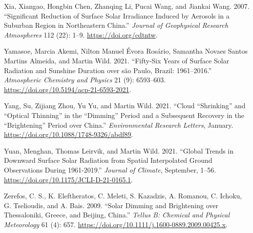 \documentclass[
]{article}
\newlength{\cslhangindent}
\newlength{\cslentryspacingunit} %
\newenvironment{CSLReferences}[2] %
 {%
  \setlength{\parindent}{0pt}
  \ifodd #1
  \let\oldpar\par
  \def\par{\hangindent=\cslhangindent\oldpar}
  \fi
  \setlength{\parskip}{#2\cslentryspacingunit}
 }%
 {}
\begin{document}
\begin{CSLReferences}{1}{0}
\leavevmode{}%
Xia, Xiangao, Hongbin Chen, Zhanqing Li, Pucai Wang, and Jiankai Wang. 2007. {``Significant Reduction of Surface Solar Irradiance Induced by Aerosols in a Suburban Region in Northeastern China.''} \emph{Journal of Geophysical Research Atmospheres} 112 (22): 1--9. \url{https://doi.org/cdtntw}.

\leavevmode{}%
Yamasoe, Marcia Akemi, Nilton Manuel Évora Rosário, Samantha Novaes Santos Martins Almeida, and Martin Wild. 2021. {``Fifty-Six Years of Surface Solar Radiation and Sunshine Duration over s{ã}o Paulo, Brazil: 1961--2016.''} \emph{Atmospheric Chemistry and Physics} 21 (9): 6593--603. \url{https://doi.org/10.5194/acp-21-6593-2021}.

\leavevmode{}%
Yang, Su, Zijiang Zhou, Yu Yu, and Martin Wild. 2021. {``Cloud {``}Shrinking{''} and {``}Optical Thinning{''} in the {``}Dimming{''} Period and a Subsequent Recovery in the {``}Brightening{''} Period over China.''} \emph{Environmental Research Letters}, January. \url{https://doi.org/10.1088/1748-9326/abdf89}.

\leavevmode{}%
Yuan, Menghan, Thomas Leirvik, and Martin Wild. 2021. {``Global Trends in Downward Surface Solar Radiation from Spatial Interpolated Ground Observations During 1961-2019.''} \emph{Journal of Climate}, September, 1--56. \url{https://doi.org/10.1175/JCLI-D-21-0165.1}.

\leavevmode{}%
Zerefos, C. S., K. Eleftheratos, C. Meleti, S. Kazadzis, A. Romanou, C. Ichoku, G. Tselioudis, and A. Bais. 2009. {``Solar Dimming and Brightening over Thessaloniki, Greece, and Beijing, China.''} \emph{Tellus B: Chemical and Physical Meteorology} 61 (4): 657. \url{https://doi.org/10.1111/j.1600-0889.2009.00425.x}.

\end{CSLReferences}
\end{document}
